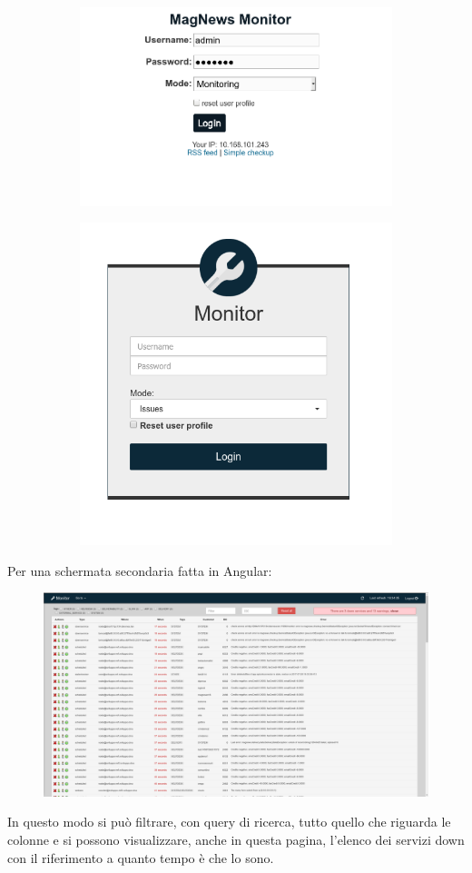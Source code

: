 \documentclass[a4paper]{article}
\begin{document}
\begin{figure}[H]
	\centering
	\begin{subfigure}
	  \centering
	  \includegraphics[width=0.45\linewidth]{login_old.png}
	\end{subfigure}%
	\begin{subfigure}
	  \centering
	  \includegraphics[width=0.45\linewidth]{login_new.png}
	\end{subfigure}
\end{figure}
Per una schermata secondaria fatta in Angular:
\begin{figure}[H]
	\includegraphics[width=\textwidth]{issue_new.png}
	\centering
\end{figure}

\par In questo modo si può filtrare, con query di ricerca, tutto quello che riguarda le colonne
e si possono visualizzare, anche in questa pagina, l'elenco dei servizi down con il 
riferimento a quanto tempo è che lo sono. 
\end{document}
